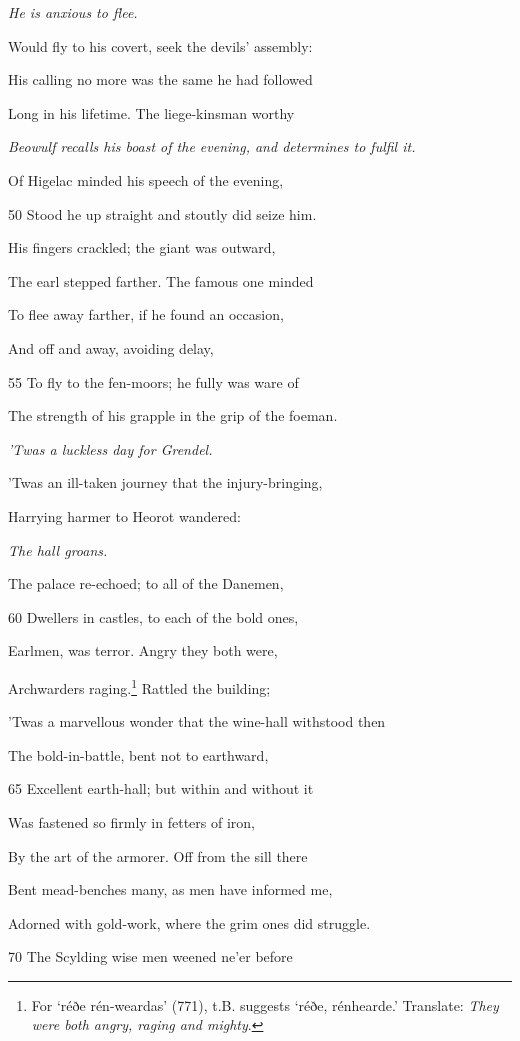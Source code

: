 \emph{He is anxious to
flee.}

Would fly to his covert, seek the devils’ assembly:

His calling no more was the same he had followed

Long in his lifetime. The liege-kinsman worthy

\emph{Beowulf recalls his
boast of the evening,
and determines
to fulfil it.}

Of Higelac minded his speech of the evening,

50
Stood he up straight and stoutly did seize him.

His fingers crackled; the giant was outward,

The earl stepped farther. The famous one minded

To flee away farther, if he found an occasion,

And off and away, avoiding delay,

55
To fly to the fen-moors; he fully was ware of

The strength of his grapple in the grip of the foeman.

\emph{’Twas a luckless
day for Grendel.}

’Twas an ill-taken journey that the injury-bringing,

Harrying harmer to Heorot wandered:

\emph{The hall groans.}

The palace re-echoed; to all of the Danemen,

60
Dwellers in castles, to each of the bold ones,

Earlmen, was terror. Angry they both were,

Archwarders raging.\footnote{For ‘réðe rén-weardas’ (771), t.B. suggests ‘réðe, rénhearde.’ Translate:
\emph{They were both angry, raging and mighty}.} Rattled the building;

’Twas a marvellous wonder that the wine-hall withstood then

The bold-in-battle, bent not to earthward,

65
Excellent earth-hall; but within and without it

Was fastened so firmly in fetters of iron,

By the art of the armorer. Off from the sill there

Bent mead-benches many, as men have informed me,

Adorned with gold-work, where the grim ones did struggle.

70
The Scylding wise men weened ne’er before

